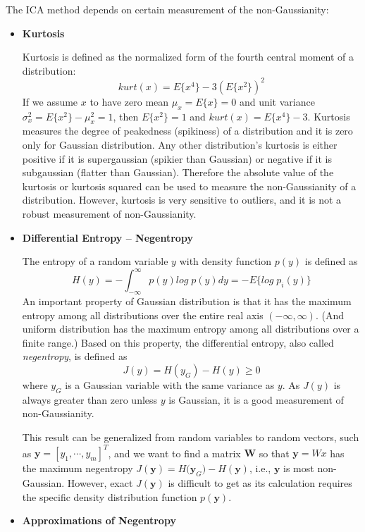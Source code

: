 \documentclass[12pt, a4paper, onecolumn]{IEEEtran}
\begin{document}
The ICA method depends on certain measurement of the non-Gaussianity:
\begin{itemize}
\item {\bf Kurtosis}

Kurtosis is defined as the normalized form of the fourth central moment
of a distribution:
\[	kurt(x)=E\{x^4\}-3(E\{x^2\})^2	\]
If we assume $x$ to have zero mean $\mu_x=E\{x\}=0$ and unit variance
$\sigma^2_x=E\{x^2\}-\mu_x^2=1$, then $E\{x^2\}=1$ and $kurt(x)=E\{x^4\}-3$.
Kurtosis measures the degree of peakedness (spikiness) of a distribution
and it is zero only for Gaussian distribution. Any other distribution's
kurtosis is either positive if it is supergaussian (spikier than Gaussian)
or negative if it is subgaussian (flatter than Gaussian). Therefore the
absolute value of the kurtosis or kurtosis squared can be used to measure
the non-Gaussianity of a distribution. However, kurtosis is very sensitive
to outliers, and it is not a robust measurement of non-Gaussianity.

\item {\bf Differential Entropy -- Negentropy}

The entropy of a random variable $y$ with density function $p(y)$ is
defined as
\[	H(y)=-\int_{-\infty}^\infty p(y) log\; p(y) dy
	=-E\{ log \; p_i(y) \}	\]
An important property of Gaussian distribution is that it has the maximum
entropy among all distributions over the entire real axis $(-\infty,\infty)$.
(And uniform distribution has the maximum entropy among all distributions
over a finite range.) Based on this property, the differential entropy,
also called {\em negentropy}, is defined as
\[	J(y)=H(y_G)-H(y) \ge 0	\]
where $y_G$ is a Gaussian variable with the same variance as $y$. As $J(y)$
is always greater than zero unless $y$ is Gaussian, it is a good measurement
of non-Gaussianity.

This result can be generalized from random variables to random vectors,
such as ${\mathbf y}=[y_1,\cdots,y_m]^T$, and we want to find a matrix
${\mathbf W}$ so that ${\mathbf y=Wx}$ has the maximum negentropy
$J({\mathbf y})=H({\mathbf y_G)}-H({\mathbf  y})$, i.e., ${\mathbf y}$ is
most non-Gaussian. However, exact $J({\mathbf y})$ is difficult to get as
its calculation requires the specific density distribution function
$p({\mathbf y})$.

\item {\bf Approximations of Negentropy}


\end{itemize}
\end{document}
